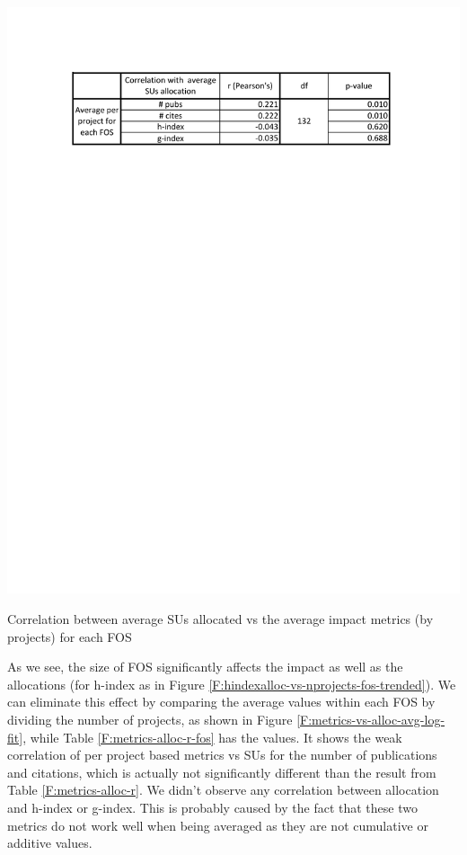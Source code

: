 \documentclass{tex/sig-alternate}
\begin{document}
\begin{table}[!htb] 
  \centering 
    \includegraphics[width=1.0\columnwidth]{images/metrics_alloc_r_fos.pdf} 
  \caption{Correlation between average SUs allocated vs the average impact metrics (by projects) for each FOS}\label{F:metrics-alloc-r-fos} 
\end{table} 
 
As we see, the size of FOS significantly affects the impact as well as the allocations (for h-index as in Figure \ref{F:hindexalloc-vs-nprojects-fos-trended}). We can eliminate this effect by comparing the average values within each FOS by dividing the number of projects, as shown in Figure \ref{F:metrics-vs-alloc-avg-log-fit}, while Table \ref{F:metrics-alloc-r-fos} has the values. It shows the weak correlation of per project based metrics vs SUs for the number of publications and citations, which is actually not significantly different than the result from Table \ref{F:metrics-alloc-r}. We didn't observe any correlation between allocation and h-index or g-index. This is probably caused by the fact that these two metrics do not work well when being averaged as they are not cumulative or additive values. 
 
\end{document}
